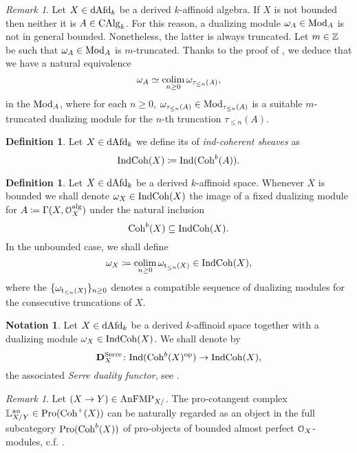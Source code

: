 \documentclass[10pt,a4paper,reqno]{amsart} %
\theoremstyle{plain}
\theoremstyle{definition}
\newtheorem{defin}[thm]{Definition}
\newtheorem{notation}[thm]{Notation}
\theoremstyle{remark}
\newtheorem{rem}[thm]{Remark}
\numberwithin{equation}{section}
\begin{document}
\begin{rem} \label{rem:dualizing_module_on_truncations}
    Let $X \in \mathrm{dAfd}_k$ be a derived $k$-affinoid algebra. If $X$ is not bounded then neither it is $A \in \mathrm{CAlg}_k$. For this reason,
    a dualizing module $\omega_A \in \mathrm{Mod}_A$ is not in general bounded. Nonetheless, the latter is always truncated.
    Let $m \in \mathbb Z$ be such that $\omega_A \in \mathrm{Mod}_A$ is $m$-truncated. Thanks to the proof of \cite[Theorem 4.3.5]{DAG-XIV},
    we deduce that we have a natural
    equivalence
        \[
            \omega_A \simeq \operatorname*{colim}_{n \ge 0} \omega_{\tau_{\le n}(A)},  
        \]
    in the \infcat $\mathrm{Mod}_A$, where for each $n \ge 0$, $\omega_{\tau_{\le n}(A)} \in \mathrm{Mod}_{\tau_{\le n}(A)}$ is a suitable $m$-truncated dualizing module for
    the $n$-th truncation $\tau_{\le n}(A)$.
\end{rem}

\begin{defin}
    Let $X \in \mathrm{dAfd}_k$ we define its \infcat of \emph{ind-coherent sheaves} as
        \[
            \mathrm{Ind}\mathrm{Coh}(X) \coloneqq \mathrm{Ind}(\mathrm{Coh}^b(A)).  
        \]
\end{defin}

\begin{defin}
    Let $X \in \mathrm{dAfd}_k$ be a derived $k$-affinoid space. Whenever $X$ is bounded we shall denote
    $\omega_X \in \mathrm{Ind}\mathrm{Coh}(X)$ the image of a fixed dualizing module for $A \coloneqq \Gamma(X, \mathcal O_X^\mathrm{alg})$ under the natural inclusion
        \[
            \mathrm{Coh}^b(X) \subseteq \mathrm{Ind}\mathrm{Coh}(X).  
        \]
    In the unbounded case, we shall define 
        \[
            \omega_X \coloneqq \operatorname*{colim}_{n \ge 0} \omega_{\mathrm t_{\le n}(X)} \in \mathrm{Ind}\mathrm{Coh}(X),  
        \]
    where the $\{ \omega_{\mathrm t_{\le n}(X)} \}_{n \ge 0}$ denotes a compatible sequence of
    dualizing modules for the consecutive truncations of $X$.
\end{defin}

\begin{notation}Let $X \in \mathrm{dAfd}_k$ be a derived $k$-affinoid space together with a dualizing module $\omega_X \in \mathrm{Ind}\mathrm{Coh}(X)$.
    We shall denote by 
        \[
            \mathbf D^\mathrm{Serre}_{X} \colon \mathrm{Ind}(\mathrm{Coh}^b(X)^\mathrm{op}) \to \mathrm{Ind}\mathrm{Coh}(X),
        \]
    the associated \emph{Serre duality functor}, see \cite[\S 2.4]{Antonio_Koszul}.
\end{notation}

\begin{rem}
    Let $(X \to Y) \in \mathrm{AnFMP}_{X/ }$. The pro-cotangent complex $\mathbb L_{X/ Y} ^\mathrm{an} \in \mathrm{Pro}(\mathrm{Coh}^+(X))$ can be naturally
    regarded as an object in the full subcategory $\mathrm{Pro}(\mathrm{Coh}^b(X))$ of pro-objects of bounded almost perfect $\mathcal O_X$-modules,
    c.f. \cite[Lemma 4.6]{Antonio_Koszul}.
\end{rem}
\end{document}
